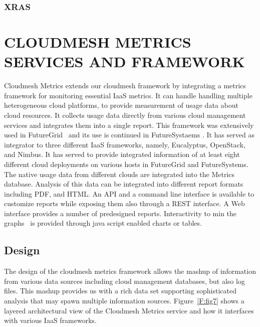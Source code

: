 \documentclass{sig-alternate-05-2015}
\newcommand{\improve}[1]{\smallskip\todo[inline, color=gray!20]{old: #1}}
\begin{document}
\improve{Gold is no longer supported}

\cite{gold-allocation}

\subsubsection{XRAS}

\cite{hart2014xras}

\section{CLOUDMESH METRICS SERVICES AND FRAMEWORK}\label{S:cloudmesh}

Cloudmesh Metrics extends our cloudmesh framework \cite{??} by
integrating a metrics framework for monitoring essential IaaS
metrics. It can handle handling multiple heterogeneous cloud
platforms, to provide measurement of usage data about cloud resources.
It collects usage data directly from various cloud management services
and integrates them into a single report. This framework was
extensively used in FutureGrid~\cite{las2010gce,las12fg-bookchapter} and its use
is continued in FutureSystaems \cite{??}. It has served as integrator
to three different IaaS frameworks, namely, Eucalyptus, OpenStack, and
Nimbus. It has served to provide integrated information of at least
eight different cloud deployments on various hosts in FutureGrid and
FutureSystems.  The native usage data from different clouds are
integrated into the Metrics database. Analysis of this data can be
integrated into different report formats including PDF, and HTML. An
API and a command line interface is available to customize reports
while exposing them also through a REST interface. A Web interface
provides a number of predesigned reports. Interactivity to min the
graphs~\cite{highsoft2012highcharts} is provided through java script
enabled charts or tables.

\subsection{Design}

The design of the cloudmesh metrics framework allows the mashup of
information from various data sources including cloud management
databases, but also log files. This mashup provides us with a rich
data set supporting sophisticated analysis that may spawn multiple
information sources. Figure~\ref{F:fig7} shows a layered architectural
view of the Cloudmesh Metrics service and how it interfaces with
various IaaS frameworks.
\end{document}
